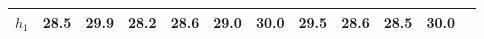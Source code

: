 
        \begin{tabular}{c|*{11}{c}}
            \hline
            \hline
                \(h_{1}\) & 28.5 & 29.9 & 28.2 & 28.6 & 29.0 & 30.0 & 29.5 & 28.6 & 28.5 & 30.0 \\
            \hline
            \hline
        \end{tabular}
        